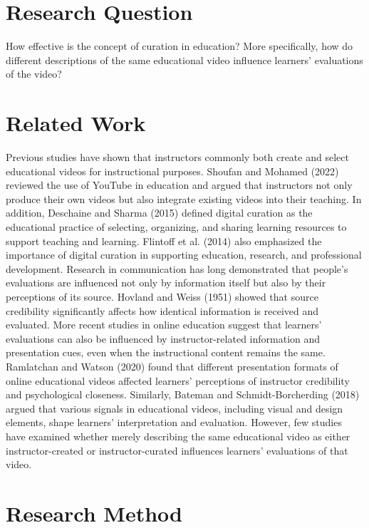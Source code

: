 \documentclass[a4paper,11pt]{article}
\begin{document}
\section{Research Question}

How effective is the concept of curation in education?
More specifically, how do different descriptions of the same educational video influence learners' evaluations of the video?

\section{Related Work}

Previous studies have shown that instructors commonly both create and select educational videos for instructional purposes. Shoufan and Mohamed (2022) reviewed the use of YouTube in education and argued that instructors not only produce their own videos but also integrate existing videos into their teaching. In addition, Deschaine and Sharma (2015) defined digital curation as the educational practice of selecting, organizing, and sharing learning resources to support teaching and learning. Flintoff et al. (2014) also emphasized the importance of digital curation in supporting education, research, and professional development.
Research in communication has long demonstrated that people's evaluations are influenced not only by information itself but also by their perceptions of its source. Hovland and Weiss (1951) showed that source credibility significantly affects how identical information is received and evaluated.
More recent studies in online education suggest that learners' evaluations can also be influenced by instructor-related information and presentation cues, even when the instructional content remains the same. Ramlatchan and Watson (2020) found that different presentation formats of online educational videos affected learners' perceptions of instructor credibility and psychological closeness. Similarly, Bateman and Schmidt-Borcherding (2018) argued that various signals in educational videos, including visual and design elements, shape learners' interpretation and evaluation.
However, few studies have examined whether merely describing the same educational video as either instructor-created or instructor-curated influences learners' evaluations of that video.

\section{Research Method}
\end{document}

